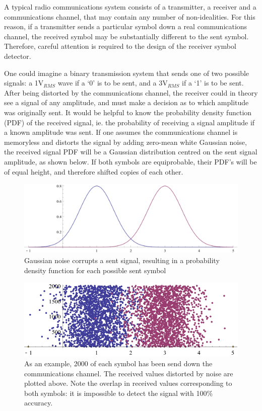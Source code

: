 A typical radio communications system consists of a transmitter, a
receiver and a communications channel, that may contain any number of
non-idealities. For this reason, if a transmitter sends a particular
symbol down a real communications channel, the received symbol may be
substantially different to the sent symbol. Therefore, careful attention
is required to the design of the receiver symbol detector.

One could imagine a binary transmission system that sends one of two
possible signals: a 1V$_{RMS}$ wave if a `0' is to be sent, and a
3V$_{RMS}$ if a `1' is to be sent. After being distorted by the
communications channel, the receiver could in theory see a signal of any
amplitude, and must make a decision as to which amplitude was originally
sent. It would be helpful to know the probability density function (PDF)
of the received signal, ie. the probability of receiving a signal
amplitude if a known amplitude was sent. If one assumes the communications
channel is memoryless and distorts the signal by adding zero-mean white Gaussian noise,
the received signal PDF will be a Gaussian distribution centred on the
sent signal amplitude, as shown below. If both symbols are equiprobable, their PDF's will be of equal height, and therefore shifted copies of each other.

\begin{figure}[htbp]
\centering
\includegraphics[width=\linewidth]{4-PAM_PDF.png}
\caption{Gaussian noise corrupts a sent signal, resulting in a
probability density function for each possible sent symbol}
\end{figure}

\begin{figure}[htbp]
\centering
\includegraphics[width=\linewidth]{4-PAM_samples.png}
\caption{As an example, 2000 of each symbol has been send down the
communications channel. The received values distorted by noise are
plotted above. Note the overlap in received values corresponding to both
symbols: it is impossible to detect the signal with 100\% accuracy.}
\end{figure}


